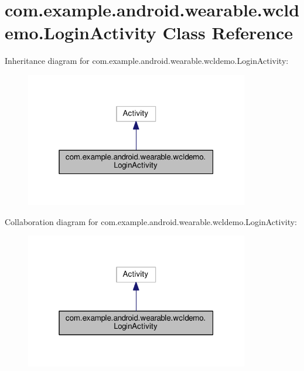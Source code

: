 \hypertarget{classcom_1_1example_1_1android_1_1wearable_1_1wcldemo_1_1LoginActivity}{}\section{com.\+example.\+android.\+wearable.\+wcldemo.\+Login\+Activity Class Reference}
\label{classcom_1_1example_1_1android_1_1wearable_1_1wcldemo_1_1LoginActivity}


Inheritance diagram for com.\+example.\+android.\+wearable.\+wcldemo.\+Login\+Activity\+:\nopagebreak
\begin{figure}[H]
\begin{center}
\leavevmode
\includegraphics[width=277pt]{de/dbe/classcom_1_1example_1_1android_1_1wearable_1_1wcldemo_1_1LoginActivity__inherit__graph}
\end{center}
\end{figure}


Collaboration diagram for com.\+example.\+android.\+wearable.\+wcldemo.\+Login\+Activity\+:\nopagebreak
\begin{figure}[H]
\begin{center}
\leavevmode
\includegraphics[width=277pt]{d8/d92/classcom_1_1example_1_1android_1_1wearable_1_1wcldemo_1_1LoginActivity__coll__graph}
\end{center}
\end{figure}
